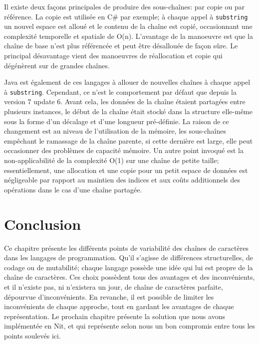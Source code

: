 Il existe deux façons principales de produire des sous-chaînes: par copie ou par référence.
La copie est utilisée en C\# par exemple; à chaque appel à \texttt{substring}
un nouvel espace est alloué et le contenu de la chaîne est copié, occasionnant une
complexité temporelle et spatiale de O(n).
L'avantage de la manoeuvre est que la chaîne de base n'est plus référencée et peut être
désallouée de façon sûre.
Le principal désavantage vient des manoeuvres de réallocation et copie qui dégénèrent
sur de grandes chaînes.

Java est également de ces langages à allouer de nouvelles chaînes à chaque appel à
\texttt{substring}.
Cependant, ce n'est le comportement par défaut que depuis la version 7 update 6.
Avant cela, les données de la chaîne étaient partagées entre plusieurs instances,
le début de la chaîne était stocké dans la structure elle-même sous la forme d'un
décalage et d'une longueur pré-définie.
La raison de ce changement est au niveau de l'utilisation de la mémoire, les sous-chaînes
empêchant le ramassage de la chaîne parente, si cette dernière est large, elle peut
occasionner des problèmes de capacité mémoire.
Un autre point invoqué est la non-applicabilité de la complexité O(1) sur une chaîne
de petite taille; essentiellement, une allocation et une copie pour un petit espace
de données est négligeable par rapport au
maintien des indices et aux coûts additionnels des opérations
dans le cas d'une chaîne partagée.

\section{Conclusion}

Ce chapitre présente les différents points de variabilité des chaînes de caractères dans les
langages de programmation.
Qu'il s'agisse de différences structurelles, de codage ou de mutabilité; chaque langage possède
une idée qui lui est propre de la chaîne de caractères.
Ces choix possèdent tous des avantages et des inconvénients, et il n'existe pas, ni n'existera
un jour, de chaîne de caractères parfaite, dépourvue d'inconvénients.
En revanche, il est possible de limiter les inconvénients de chaque approche, tout en
gardant les avantages de chaque représentation.
Le prochain chapitre présente la solution que nous avons implémentée en Nit, et qui représente
selon nous un bon compromis entre tous les points soulevés ici.
